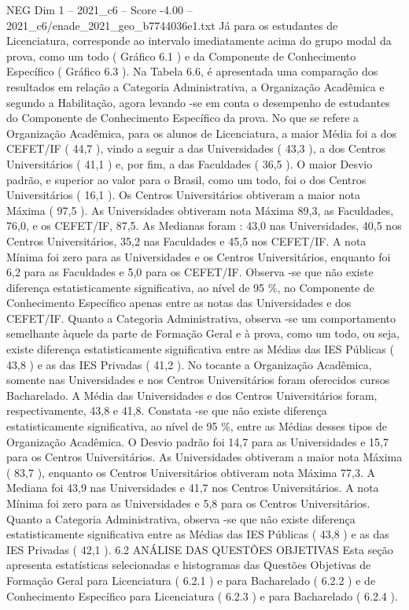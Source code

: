 \begin{textsample}{NEG Dim 1 – 2021\_c6 – Score -4.00 – 2021\_c6/enade\_2021\_geo\_b7744036e1.txt}
Já para os estudantes de Licenciatura, corresponde ao intervalo imediatamente acima do grupo modal da prova, como um todo ( Gráfico 6.1 ) e da Componente de Conhecimento Específico ( Gráfico 6.3 ).
Na Tabela 6.6, é apresentada uma comparação dos resultados em relação a Categoria Administrativa, a Organização Acadêmica e segundo a Habilitação, agora levando -se em conta o desempenho de estudantes do Componente de Conhecimento Específico da prova.
No que se refere a Organização Acadêmica, para os alunos de Licenciatura, a maior Média foi a dos CEFET/IF ( 44,7 ), vindo a seguir a das Universidades ( 43,3 ), a dos Centros Universitários ( 41,1 ) e, por fim, a das Faculdades ( 36,5 ).
O maior Desvio padrão, e superior ao valor para o Brasil, como um todo, foi o dos Centros Universitários ( 16,1 ).
Os Centros Universitários obtiveram a maior nota Máxima ( 97,5 ).
As Universidades obtiveram nota Máxima 89,3, as Faculdades, 76,0, e os CEFET/IF, 87,5.
As Medianas foram : 43,0 nas Universidades, 40,5 nos Centros Universitários, 35,2 nas Faculdades e 45,5 nos CEFET/IF.
A nota Mínima foi zero para as Universidades e os Centros Universitários, enquanto foi 6,2 para as Faculdades e 5,0 para os CEFET/IF.
Observa -se que não existe diferença estatisticamente significativa, ao nível de 95 \%, no Componente de Conhecimento Específico apenas entre as notas das Universidades e dos CEFET/IF.
Quanto a Categoria Administrativa, observa -se um comportamento semelhante àquele da parte de Formação Geral e à prova, como um todo, ou seja, existe diferença estatisticamente significativa entre as Médias das IES Públicas ( 43,8 ) e as das IES Privadas ( 41,2 ).
No tocante a Organização Acadêmica, somente nas Universidades e nos Centros Universitários foram oferecidos cursos Bacharelado.
A Média das Universidades e dos Centros Universitários foram, respectivamente, 43,8 e 41,8.
Constata -se que não existe diferença estatisticamente significativa, ao nível de 95 \%, entre as Médias desses tipos de Organização Acadêmica.
O Desvio padrão foi 14,7 para as Universidades e 15,7 para os Centros Universitários.
As Universidades obtiveram a maior nota Máxima ( 83,7 ), enquanto os Centros Universitários obtiveram nota Máxima 77,3.
A Mediana foi 43,9 nas Universidades e 41,7 nos Centros Universitários.
A nota Mínima foi zero para as Universidades e 5,8 para os Centros Universitários.
Quanto a Categoria Administrativa, observa -se que não existe diferença estatisticamente significativa entre as Médias das IES Públicas ( 43,8 ) e as das IES Privadas ( 42,1 ). 6.2 ANÁLISE DAS QUESTÕES OBJETIVAS Esta seção apresenta estatísticas selecionadas e histogramas das Questões Objetivas de Formação Geral para Licenciatura ( 6.2.1 ) e para Bacharelado ( 6.2.2 ) e de Conhecimento Específico para Licenciatura ( 6.2.3 ) e para Bacharelado ( 6.2.4 ).

\end{textsample}
